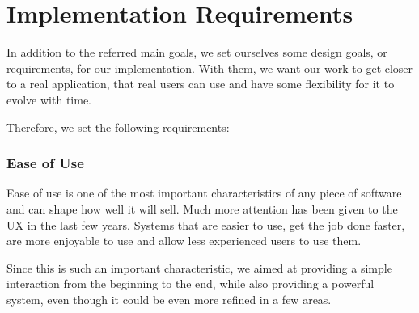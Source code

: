 











\section{Implementation Requirements} %
\label{reqs:Implementation_Requirements}

In addition to the referred main goals, we set ourselves some design goals, or requirements, for our implementation. With them, we want our work to get closer to a real application, that real users can use and have some flexibility for it to evolve with time.

Therefore, we set the following requirements:

\subsubsection{Ease of Use} %
\label{reqs:ease_of_use}

Ease of use is one of the most important characteristics of any piece of software and can shape how well it will sell. Much more attention has been given to the \ac{UX} in the last few years. Systems that are easier to use, get the job done faster, are more enjoyable to use and allow less experienced users to use them.

Since this is such an important characteristic, we aimed at providing a simple interaction from the beginning to the end, while also providing a powerful system, even though it could be even more refined in a few areas.

